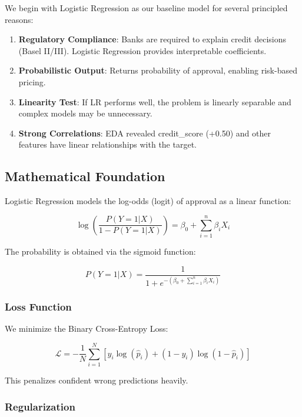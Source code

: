 \documentclass[12pt,a4paper]{article}
\begin{document}
We begin with Logistic Regression as our baseline model for several principled reasons:

\begin{enumerate}
    \item \textbf{Regulatory Compliance}: Banks are required to explain credit decisions (Basel II/III). Logistic Regression provides interpretable coefficients.
    \item \textbf{Probabilistic Output}: Returns probability of approval, enabling risk-based pricing.
    \item \textbf{Linearity Test}: If LR performs well, the problem is linearly separable and complex models may be unnecessary.
    \item \textbf{Strong Correlations}: EDA revealed credit\_score (+0.50) and other features have linear relationships with the target.
\end{enumerate}

\subsection{Mathematical Foundation}

Logistic Regression models the log-odds (logit) of approval as a linear function:

\begin{equation}
\log\left(\frac{P(Y=1|X)}{1-P(Y=1|X)}\right) = \beta_0 + \sum_{i=1}^{n} \beta_i X_i
\end{equation}

The probability is obtained via the sigmoid function:

\begin{equation}
P(Y=1|X) = \frac{1}{1 + e^{-(\beta_0 + \sum_{i=1}^{n} \beta_i X_i)}}
\end{equation}

\subsubsection{Loss Function}

We minimize the Binary Cross-Entropy Loss:

\begin{equation}
\mathcal{L} = -\frac{1}{N}\sum_{i=1}^{N}\left[y_i \log(\hat{p}_i) + (1-y_i)\log(1-\hat{p}_i)\right]
\end{equation}

This penalizes confident wrong predictions heavily.

\subsubsection{Regularization}
\end{document}
